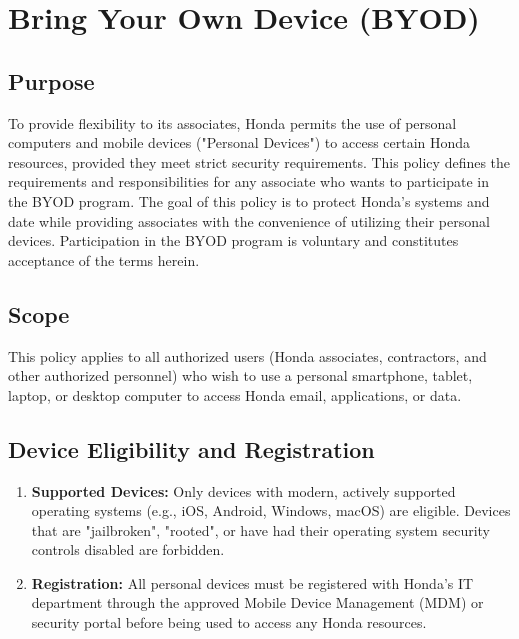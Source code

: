 \chapter{Bring Your Own Device (BYOD)}
\pagestyle{fancy}

\fancyhf{}

\fancyfoot[C]{\thepage}

\renewcommand{\headrulewidth}{0pt}
\renewcommand{\footrulewidth}{0pt}

\section{Purpose}
To provide flexibility to its associates, Honda permits the use of personal computers and mobile devices ("Personal Devices") to access certain Honda resources, provided they meet strict security requirements.  This policy defines the requirements and responsibilities for any associate who wants to participate in the BYOD program.  The goal of this policy is to protect Honda's systems and date while providing associates with the convenience of utilizing their personal devices.  Participation in the BYOD program is voluntary and constitutes acceptance of the terms herein.

\section{Scope}
This policy applies to all authorized users (Honda associates, contractors, and other authorized personnel) who wish to use a personal smartphone, tablet, laptop, or desktop computer to access Honda email, applications, or data.

\section{Device Eligibility and Registration}

\begin{enumerate}
    \item \textbf{Supported Devices:} Only devices with modern, actively supported operating systems (e.g., iOS, Android, Windows, macOS) are eligible.  Devices that are "jailbroken", "rooted", or have had their operating system security controls disabled are forbidden.
    \item \textbf{Registration:} All personal devices must be registered with Honda's IT department through the approved Mobile Device Management (MDM) or security portal before being used to access any Honda resources.
\end{enumerate}

